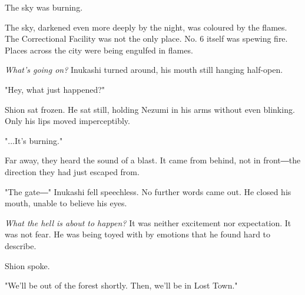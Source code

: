 The sky was burning.

The sky, darkened even more deeply by the night, was coloured by the
flames. The Correctional Facility was not the only place. No. 6 itself
was spewing fire. Places across the city were being engulfed in flames.

\emph{What's going on?} Inukashi turned around, his mouth still hanging
half-open.

"Hey, what just happened?"

Shion sat frozen. He sat still, holding Nezumi in his arms without even
blinking. Only his lips moved imperceptibly.

"...It's burning."

Far away, they heard the sound of a blast. It came from behind, not in
front―the direction they had just escaped from.

"The gate―" Inukashi fell speechless. No further words came out. He
closed his mouth, unable to believe his eyes.

\emph{What the hell is about to happen?} It was neither excitement nor
expectation. It was not fear. He was being toyed with by emotions that
he found hard to describe.

Shion spoke.

"We'll be out of the forest shortly. Then, we'll be in Lost Town."